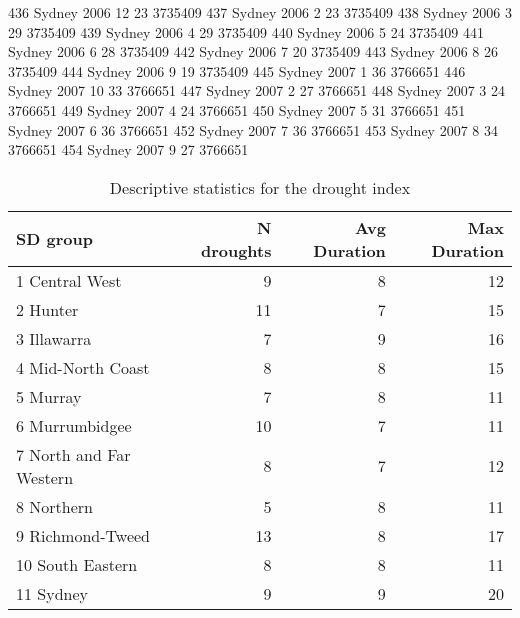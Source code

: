 \documentclass[a4paper]{article}                %
\begin{document}
\begin{Schunk}
\begin{Soutput}
436   Sydney  2006    12      23 3735409
437   Sydney  2006     2      23 3735409
438   Sydney  2006     3      29 3735409
439   Sydney  2006     4      29 3735409
440   Sydney  2006     5      24 3735409
441   Sydney  2006     6      28 3735409
442   Sydney  2006     7      20 3735409
443   Sydney  2006     8      26 3735409
444   Sydney  2006     9      19 3735409
445   Sydney  2007     1      36 3766651
446   Sydney  2007    10      33 3766651
447   Sydney  2007     2      27 3766651
448   Sydney  2007     3      24 3766651
449   Sydney  2007     4      24 3766651
450   Sydney  2007     5      31 3766651
451   Sydney  2007     6      36 3766651
452   Sydney  2007     7      36 3766651
453   Sydney  2007     8      34 3766651
454   Sydney  2007     9      27 3766651
\end{Soutput}
\end{Schunk}


        \begin{table}[!ht]
        \begin{center}
        \caption{Descriptive statistics for the drought index}
        \label{tab:tab1}
        \begin{tabular}{lrrr}
        \hline
        SD group & N droughts & Avg Duration & Max Duration \\
        \hline
        1 Central West & 9 & 8 & 12 \\
        2 Hunter & 11 & 7 & 15 \\
        3 Illawarra & 7 & 9 & 16 \\
        4 Mid-North Coast & 8 & 8 & 15 \\
        5 Murray & 7 & 8 & 11 \\
        6 Murrumbidgee & 10 & 7 & 11 \\
        7 North and Far Western & 8 & 7 & 12 \\
        8 Northern & 5 & 8 & 11 \\
        9 Richmond-Tweed & 13 & 8 & 17 \\
        10 South Eastern & 8 & 8 & 11 \\
        11 Sydney & 9 & 9 & 20 \\
        \hline
        \end{tabular}
        \end{center}
        \end{table}
\end{document}
